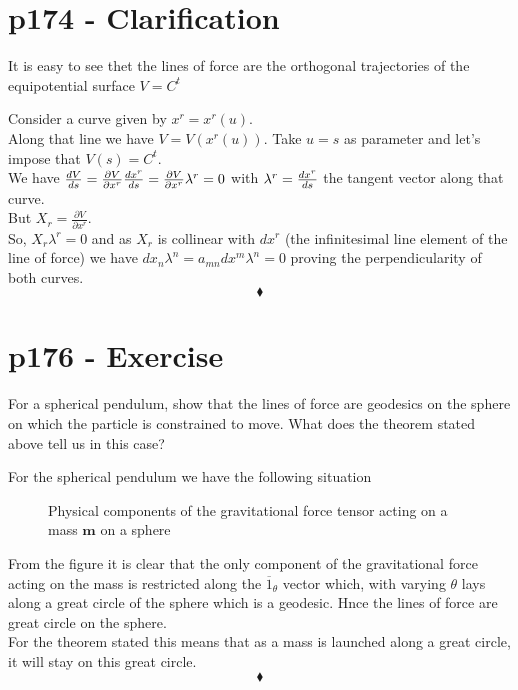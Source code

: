 \section{p174 - Clarification}
\begin{tcolorbox}
It is easy to see thet the lines of force are the orthogonal trajectories of the equipotential surface $V=C^{t}$
\end{tcolorbox}
Consider a curve given by $x^r=x^r\left(u\right)$. \\Along that line we have $V= V\left(x^r\left(u\right)\right)$. Take $u=s$ as parameter and let's impose that $V\left(s\right)= C^{t}$.\\ We have
$\dv{V}{s} = \frac{\partial{V}}{\partial{x^r}}\dv{x^r}{s} =\frac{\partial{V}}{\partial{x^r}}\lambda^r =0$ with $\lambda^r=\dv{x^r}{s}$ the tangent vector along that curve.\\ But $X_r = \frac{\partial{V}}{\partial{x^r}}$. \\
So, $X_r\lambda^r=0$ and as $X_r$ is collinear with $dx^r$ (the infinitesimal line element of the line of force) we have $dx_n \lambda^n = a_{mn}dx^m \lambda^n=0$ proving the perpendicularity of both curves.
$$\blacklozenge$$
\newpage

\section{p176 - Exercise}
\begin{tcolorbox}
For a spherical pendulum, show that the lines of force are geodesics on the sphere on which the particle is constrained to move. What does the theorem stated above tell us in this case?
\end{tcolorbox}
For the spherical pendulum we have the following situation
\begin{figure}[H]

\caption{Physical components of the gravitational force tensor acting on a mass $\mathbf{m}$ on a sphere }
\label{fig:fig_p176_Ex1}
\end{figure}
From the figure it is clear that the only component of the gravitational force acting on the mass is restricted along the $\overline{1}_{\theta}$ vector which, with varying $\theta$ lays along a great circle of the sphere which is a geodesic. Hnce the lines of force are great circle on the sphere. \\
For the theorem stated this means that as a mass is launched along a great circle, it will stay on this great circle.
$$\blacklozenge$$
\newpage




